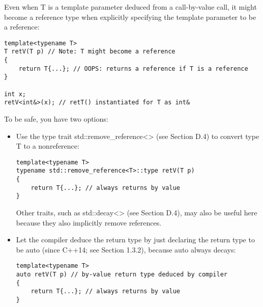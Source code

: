 Even when T is a template parameter deduced from a call-by-value call, it might become a reference type when explicitly specifying the template parameter to be a reference:

\begin{lstlisting}[style=styleCXX]
template<typename T>
T retV(T p) // Note: T might become a reference
{
	return T{...}; // OOPS: returns a reference if T is a reference
}

int x;
retV<int&>(x); // retT() instantiated for T as int&
\end{lstlisting}

To be safe, you have two options:

\begin{itemize}
\item 
Use the type trait std::remove\_reference<> (see Section D.4) to convert type T to a nonreference:

\begin{lstlisting}[style=styleCXX]
template<typename T>
typename std::remove_reference<T>::type retV(T p)
{
	return T{...}; // always returns by value
}
\end{lstlisting}

Other traits, such as std::decay<> (see Section D.4), may also be useful here because they also implicitly remove references.

\item 
Let the compiler deduce the return type by just declaring the return type to be auto (since C++14; see Section 1.3.2), because auto always decays:

\begin{lstlisting}[style=styleCXX]
template<typename T>
auto retV(T p) // by-value return type deduced by compiler
{
	return T{...}; // always returns by value
}
\end{lstlisting}

\end{itemize}


















